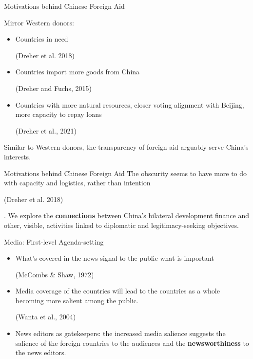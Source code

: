 \documentclass{beamer}
\begin{document}


\begin{frame}{Motivations behind Chinese Foreign Aid}


Mirror Western donors:

\begin{itemize}
    \item Countries in need \begin{footnotesize} (Dreher et al. 2018) \end{footnotesize}
    \item Countries import more goods from China \begin{footnotesize} (Dreher and Fuchs, 2015) \end{footnotesize}
    \item Countries with more natural resources, closer voting alignment with Beijing, more capacity to repay loans \begin{footnotesize} (Dreher et al., 2021) \end{footnotesize}
\end{itemize}

Similar to Western donors, the transparency of foreign aid arguably serve China’s interests.
\end{frame}

\begin{frame}{Motivations behind Chinese Foreign Aid}
The obscurity seems to have more to do with capacity and logistics, rather than intention \begin{footnotesize} (Dreher et al. 2018) \end{footnotesize}. We
explore the \textbf{connections }between China’s bilateral development finance and other, visible,
activities linked to diplomatic and legitimacy-seeking objectives. 

\end{frame}

\begin{frame}{Media: First-level Agenda-setting}


\begin{itemize}
\item What's covered in the news signal to the public what is important \begin{footnotesize} (McCombs \& Shaw, 1972) \end{footnotesize}

\item Media coverage of the countries will lead to the countries as a whole becoming more
salient among the public. \begin{footnotesize} (Wanta et al., 2004) \end{footnotesize}

\item News editors as gatekeepers: the increased media salience suggests the salience of the foreign countries to the audiences and the \textbf{newsworthiness }to the news editors.
\end{itemize}

\end{frame}
\end{document}

